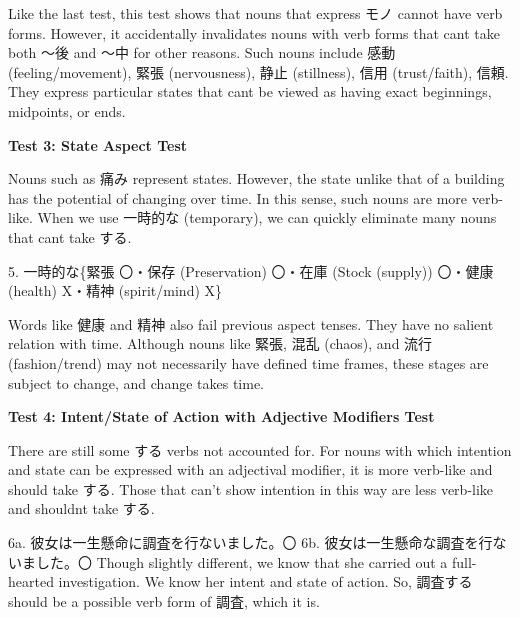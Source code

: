 \par{ Like the last test, this test shows that nouns that express モノ cannot have verb forms. However, it accidentally invalidates nouns with verb forms that can\textquotesingle t take both ～後 and ～中 for other reasons. Such nouns include 感動 (feeling\slash movement), 緊張 (nervousness), 静止 (stillness), 信用 (trust\slash faith), 信頼. They express particular states that can\textquotesingle t be viewed as having exact beginnings, midpoints, or ends. }

\begin{center}
\textbf{Test 3: State Aspect Test }
\end{center}

\par{ Nouns such as 痛み represent states. However, the state unlike that of a building has the potential of changing over time. In this sense, such nouns are more verb-like. When we use 一時的な (temporary), we can quickly eliminate many nouns that can\textquotesingle t take する. }

\par{5. 一時的な\{緊張 〇・保存 (Preservation) 〇・在庫 (Stock (supply)) 〇・健康 (health) X・精神 (spirit\slash mind) X\} }

\par{ Words like 健康 and 精神 also fail previous aspect tenses. They have no salient relation with time. Although nouns like 緊張, 混乱 (chaos), and 流行 (fashion\slash trend) may not necessarily have defined time frames, these stages are subject to change, and change takes time. }

\begin{center}
\textbf{Test 4: Intent\slash State of Action with Adjective Modifiers Test }
\end{center}

\par{ There are still some する verbs not accounted for. For nouns with which intention and state can be expressed with an adjectival modifier, it is more verb-like and should take する. Those that can't show intention in this way are less verb-like and shouldn\textquotesingle t take する. }

\par{6a. 彼女は一生懸命に調査を行ないました。〇 \hfill\break
6b. 彼女は一生懸命な調査を行ないました。〇 \hfill\break
 \hfill\break
 Though slightly different, we know that she carried out a full-hearted investigation. We know her intent and state of action. So, 調査する should be a possible verb form of 調査, which it is. }


